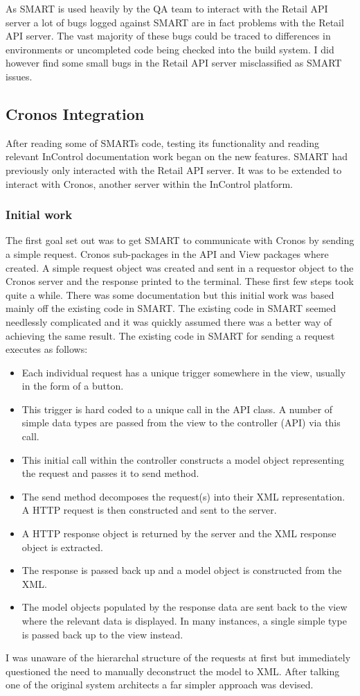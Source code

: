 \documentclass[a4paper, 11pt, titlepage]{article}
\begin{document}
As SMART is used heavily by the QA team to interact with the Retail API server a lot of bugs logged against SMART are in fact problems with the Retail API server. The vast majority of these bugs could be traced to differences in environments or uncompleted code being checked into the build system. I did however find some small bugs in the Retail API server misclassified as SMART issues. 
 
  
\subsection{Cronos Integration} 
After reading some of SMARTs code, testing its functionality and reading relevant InControl documentation work began on the new features. SMART had previously only interacted with the Retail API server. It was to be extended to interact with Cronos, another server within the InControl platform. 
 
\subsubsection{Initial work} 
The first goal set out was to get SMART to communicate with Cronos by sending a simple request. Cronos sub-packages in the API and View packages where created. A simple request object was created and sent in a requestor object to the Cronos server and the response printed to the terminal. These first few steps took quite a while. There was some documentation but this initial work was based mainly off the existing code in SMART. The existing code in SMART seemed needlessly complicated and it was quickly assumed there was a better way of achieving the same result. The existing code in SMART for sending a request executes as follows: 
\begin{itemize} 
\item Each individual request has a unique trigger somewhere in the view, usually in the form of a button. 
\item This trigger is hard coded to a unique call in the API class. A number of simple data types are passed from the view to the controller (API) via this call. 
\item This initial call within the controller constructs a model object representing the request and passes it to send method. 
\item The send method decomposes the request(s) into their XML representation. A HTTP request is then constructed and sent to the server. 
\item A HTTP response object is returned by the server and the XML response object is extracted. 
\item The response is passed back up and a model object is constructed from the XML. 
\item The model objects populated by the response data are sent back to the view where the relevant data is displayed. In many instances, a single simple type is passed back up to the view instead. 
\end{itemize} 
I was unaware of the hierarchal structure of the requests at first but immediately questioned the need to manually deconstruct the model to XML. After talking one of the original system architects a far simpler approach was devised. 
\end{document}
